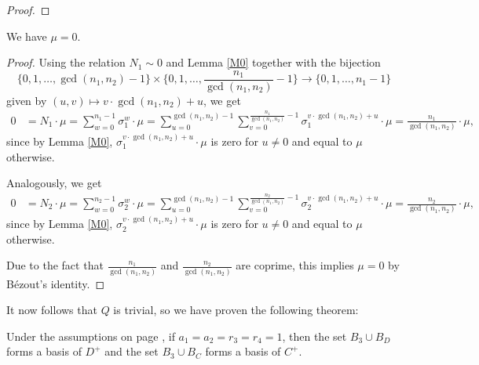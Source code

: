 \begin{proof}
\end{proof}

\begin{prop}
We have $\mu=0.$
\end{prop}
\begin{proof}
Using the relation $N_1\sim 0$ and Lemma \ref{M0} together with the bijection $$\{0,1,\dots,\gcd(n_1,n_2)-1\}\times \{0,1,\dots,\frac{n_1}{\gcd(n_1,n_2)}-1\}\to \{0,1,\dots, n_1-1\}$$
given by $(u,v)\mapsto v\cdot \gcd(n_1,n_2)+u$, we get
\begin{align*}
0&=N_1\cdot \mu=\sum_{w=0}^{n_1-1}\sigma_1^w\cdot \mu=\sum_{u=0}^{\gcd(n_1,n_2)-1}\sum_{v=0}^{\frac{n_1}{\gcd(n_1,n_2)}-1}\sigma_1^{ v\cdot \gcd(n_1,n_2)+u}\cdot \mu
=\frac{n_1}{\gcd(n_1,n_2)}\cdot \mu,
\end{align*}
since by Lemma \ref{M0}, $\sigma_1^{ v\cdot \gcd(n_1,n_2)+u}\cdot \mu$ is zero for $u\neq 0$ and equal to $\mu$ otherwise.

Analogously, we get 
\begin{align*}
0&=N_2\cdot \mu=\sum_{w=0}^{n_2-1}\sigma_2^w\cdot \mu=\sum_{u=0}^{\gcd(n_1,n_2)-1}\sum_{v=0}^{\frac{n_2}{\gcd(n_1,n_2)}-1}\sigma_2^{ v\cdot \gcd(n_1,n_2)+u}\cdot \mu
=\frac{n_2}{\gcd(n_1,n_2)}\cdot \mu,
\end{align*}
since by Lemma \ref{M0}, $\sigma_2^{ v\cdot \gcd(n_1,n_2)+u}\cdot \mu$ is zero for $u\neq 0$ and equal to $\mu$ otherwise.

Due to the fact that $\frac{n_1}{\gcd(n_1,n_2)}$ and $\frac{n_2}{\gcd(n_1,n_2)}$ are coprime, this implies $\mu=0$ by Bézout's identity.
\end{proof}
It now follows that $Q$ is trivial, so we have proven the following theorem:
\begin{theorem}\label{th3}
Under the assumptions on page \pageref{assum}, if $a_1=a_2=r_3=r_4=1$, then the set $B_{3}\cup B_D$ forms a basis of $D^+$ and the set $B_{3}\cup B_C$ forms a basis of $C^+$.
\end{theorem}

